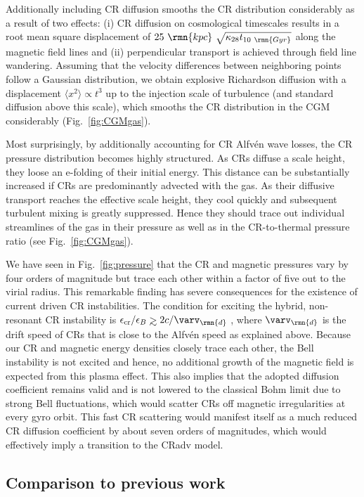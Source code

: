 \documentclass[useAMS,usenatbib]{mnras}
\def\gtrsim{\mathrel{\hbox{\rlap{\hbox{\lower4pt\hbox{$\sim$}}}\hbox{$>$}}}}
\newcommand{\CR}{\mathrm{cr}}
\begin{document}
Additionally including CR diffusion smooths the CR distribution considerably as a result of two effects: (i) CR diffusion on cosmological timescales results in a root mean square displacement of $25~\rmn{kpc}~\sqrt{\kappa_{28} t_{10~\rmn{Gyr}}}$ along the magnetic field lines and (ii) perpendicular transport is achieved through field line wandering. Assuming that the velocity differences between neighboring points follow a Gaussian distribution, we obtain explosive Richardson diffusion with a displacement $\langle x^2\rangle \propto t^3$ up to the injection scale of turbulence (and standard diffusion above this scale), which smooths the CR distribution in the CGM considerably (Fig.~\ref{fig:CGMgas}).

Most surprisingly, by additionally accounting for CR Alfv\'en wave losses, the CR pressure distribution becomes highly structured. As CRs diffuse a scale height, they loose an e-folding of their initial energy. This distance can be substantially increased if CRs are predominantly advected with the gas. As their diffusive transport reaches the effective scale height, they cool quickly and subsequent turbulent mixing is greatly suppressed. Hence they should trace out individual streamlines of the gas in their pressure as well as in the CR-to-thermal pressure ratio (see Fig.~\ref{fig:CGMgas}).

We have seen in Fig.~\ref{fig:pressure} that the CR and magnetic pressures vary by four orders of magnitude but trace each other within a factor of five out to the virial radius. This remarkable finding has severe consequences for the existence of current driven CR instabilities. The condition for exciting the hybrid, non-resonant CR instability is $\epsilon_\CR/\epsilon_B \gtrsim 2 c / \varv_\rmn{d}$ \citep{Bell2004}, where $\varv_\rmn{d}$ is the drift speed of CRs that is close to the Alfv\'en speed as explained above. Because our CR and magnetic energy densities closely trace each other, the Bell instability is not excited and hence, no additional growth of the magnetic field is expected from this plasma effect. This also implies that the adopted diffusion coefficient remains valid and is not lowered to the classical Bohm limit due to strong Bell fluctuations, which would scatter CRs off magnetic irregularities at every gyro orbit. This fast CR scattering would manifest itself as a much reduced CR diffusion coefficient by about seven orders of magnitudes, which would effectively imply a transition to the CRadv model.

\subsection{Comparison to previous work}
\end{document}
